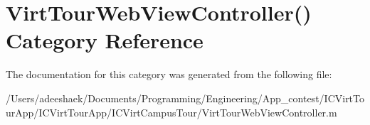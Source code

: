\hypertarget{category_virt_tour_web_view_controller_07_08}{\section{Virt\-Tour\-Web\-View\-Controller() Category Reference}
\label{category_virt_tour_web_view_controller_07_08}
}


The documentation for this category was generated from the following file\-:\begin{DoxyCompactItemize}
\item 
/\-Users/adeeshaek/\-Documents/\-Programming/\-Engineering/\-App\-\_\-contest/\-I\-C\-Virt\-Tour\-App/\-I\-C\-Virt\-Tour\-App/\-I\-C\-Virt\-Campus\-Tour/Virt\-Tour\-Web\-View\-Controller.\-m\end{DoxyCompactItemize}
